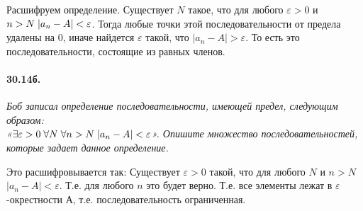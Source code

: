 \documentclass{book}
\begin{document}
Расшифруем определение. Существует $N$ такое, что для любого $\varepsilon > 0$ и $n > N \thickspace |a_n - A| < \varepsilon$. Тогда любые точки этой последовательности от предела удалены на 0, иначе найдется $\varepsilon$ такой, что $ |a_n - A| > \varepsilon$. То есть это последовательности, состоящие из равных членов.


\paragraph{30.14б.}
\textit{Боб записал определение последовательности, имеющей предел, следующим образом: \\ «$\exists \varepsilon > 0 \thickspace \forall N \thickspace \forall n > N \thickspace |a_n - A| < \varepsilon$». Опишите множество последовательностей, которые задает данное определение.}

Это расшифровывается так: Существует $\varepsilon > 0$ такой, что для любого $N$ и $n>N$  $  |a_n - A| < \varepsilon$. Т.е. для любого $n$ это будет верно. Т.е. все элементы лежат в $\varepsilon$-окрестности А, т.е. последовательность ограниченная.
\end{document}
